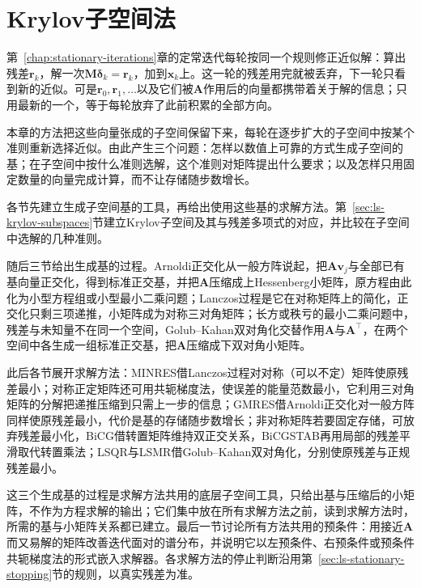 \chapter{Krylov子空间法}
\label{sec:ls-krylov-iterations}
\label{chap:krylov-methods}

第~\ref{chap:stationary-iterations}章的定常迭代每轮按同一个规则修正近似解：算出残差$\bm r_k$，解一次$\bm M\bm\delta_k=\bm r_k$，加到$\bm x_k$上。这一轮的残差用完就被丢弃，下一轮只看到新的近似。可是$\bm r_0,\bm r_1,\ldots$以及它们被$\bm A$作用后的向量都携带着关于解的信息；只用最新的一个，等于每轮放弃了此前积累的全部方向。

本章的方法把这些向量张成的子空间保留下来，每轮在逐步扩大的子空间中按某个准则重新选择近似。由此产生三个问题：怎样以数值上可靠的方式生成子空间的基；在子空间中按什么准则选解，这个准则对矩阵提出什么要求；以及怎样只用固定数量的向量完成计算，而不让存储随步数增长。

各节先建立生成子空间基的工具，再给出使用这些基的求解方法。第~\ref{sec:ls-krylov-subspaces}节建立Krylov子空间及其与残差多项式的对应，并比较在子空间中选解的几种准则。

随后三节给出生成基的过程。Arnoldi正交化从一般方阵说起，把$\bm A\bm v_j$与全部已有基向量正交化，得到标准正交基，并把$\bm A$压缩成上Hessenberg小矩阵，原方程由此化为小型方程组或小型最小二乘问题；Lanczos过程是它在对称矩阵上的简化，正交化只剩三项递推，小矩阵成为对称三对角矩阵；长方或秩亏的最小二乘问题中，残差与未知量不在同一个空间，Golub--Kahan双对角化交替作用$\bm A$与$\bm A^\top$，在两个空间中各生成一组标准正交基，把$\bm A$压缩成下双对角小矩阵。

此后各节展开求解方法：MINRES借Lanczos过程对对称（可以不定）矩阵使原残差最小；对称正定矩阵还可用共轭梯度法，使误差的能量范数最小，它利用三对角矩阵的分解把递推压缩到只需上一步的信息；GMRES借Arnoldi正交化对一般方阵同样使原残差最小，代价是基的存储随步数增长；非对称矩阵若要固定存储，可放弃残差最小化，BiCG借转置矩阵维持双正交关系，BiCGSTAB再用局部的残差平滑取代转置乘法；LSQR与LSMR借Golub--Kahan双对角化，分别使原残差与正规残差最小。

这三个生成基的过程是求解方法共用的底层子空间工具，只给出基与压缩后的小矩阵，不作为方程求解的输出；它们集中放在所有求解方法之前，读到求解方法时，所需的基与小矩阵关系都已建立。最后一节讨论所有方法共用的预条件：用接近$\bm A$而又易解的矩阵改善迭代面对的谱分布，并说明它以左预条件、右预条件或预条件共轭梯度法的形式嵌入求解器。各求解方法的停止判断沿用第~\ref{sec:ls-stationary-stopping}节的规则，以真实残差为准。

